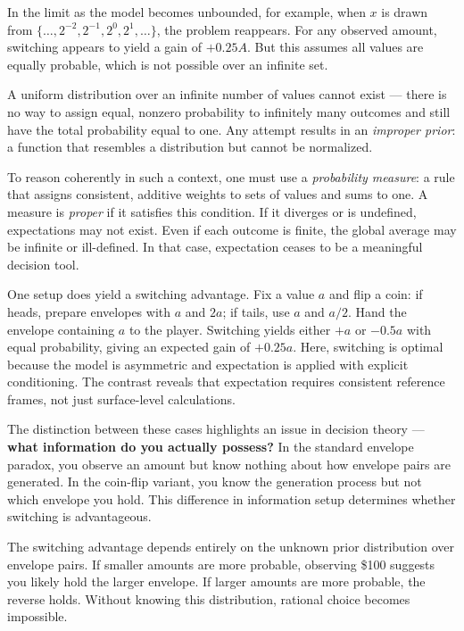 In the limit as the model becomes unbounded, for example, when \( x \) is drawn from \( \{\dots, 2^{-2}, 2^{-1}, 2^0, 2^1, \dots\} \), the problem reappears. For any observed amount, switching appears to yield a gain of \( +0.25A \). But this assumes all values are equally probable, which is not possible over an infinite set.

A uniform distribution over an infinite number of values cannot exist — there is no way to assign equal, nonzero probability to infinitely many outcomes and still have the total probability equal to one. Any attempt results in an \emph{improper prior}: a function that resembles a distribution but cannot be normalized.

To reason coherently in such a context, one must use a \emph{probability measure}: a rule that assigns consistent, additive weights to sets of values and sums to one. A measure is \emph{proper} if it satisfies this condition. If it diverges or is undefined, expectations may not exist. Even if each outcome is finite, the global average may be infinite or ill-defined. In that case, expectation ceases to be a meaningful decision tool.

One setup does yield a switching advantage. Fix a value \( a \) and flip a coin: if heads, prepare envelopes with \( a \) and \( 2a \); if tails, use \( a \) and \( a/2 \). Hand the envelope containing \( a \) to the player. Switching yields either \( +a \) or \( -0.5a \) with equal probability, giving an expected gain of \( +0.25a \). Here, switching is optimal because the model is asymmetric and expectation is applied with explicit conditioning. The contrast reveals that expectation requires consistent reference frames, not just surface-level calculations.

The distinction between these cases highlights an issue in decision theory — \textbf{what information do you actually possess?} In the standard envelope paradox, you observe an amount but know nothing about how envelope pairs are generated. In the coin-flip variant, you know the generation process but not which envelope you hold. This difference in information setup determines whether switching is advantageous.

The switching advantage depends entirely on the unknown prior distribution over envelope pairs. If smaller amounts are more probable, observing \$100 suggests you likely hold the larger envelope. If larger amounts are more probable, the reverse holds. Without knowing this distribution, rational choice becomes impossible.

